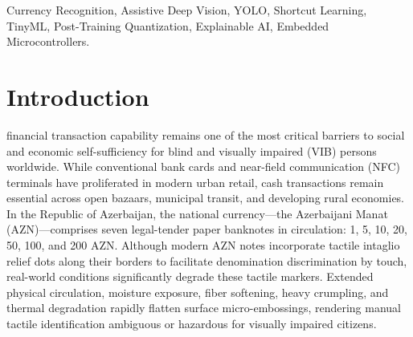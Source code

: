\documentclass[conference]{IEEEtran}
\begin{document}
\begin{IEEEkeywords}
Currency Recognition, Assistive Deep Vision, YOLO, Shortcut Learning, TinyML, Post-Training Quantization, Explainable AI, Embedded Microcontrollers.
\end{IEEEkeywords}

\section{Introduction}
\label{sec:intro}

 financial transaction capability remains one of the most critical barriers to social and economic self-sufficiency for blind and visually impaired (VIB) persons worldwide. While conventional bank cards and near-field communication (NFC) terminals have proliferated in modern urban retail, cash transactions remain essential across open bazaars, municipal transit, and developing rural economies. In the Republic of Azerbaijan, the national currency---the Azerbaijani Manat (AZN)---comprises seven legal-tender paper banknotes in circulation: 1, 5, 10, 20, 50, 100, and 200 AZN. Although modern AZN notes incorporate tactile intaglio relief dots along their borders to facilitate denomination discrimination by touch, real-world conditions significantly degrade these tactile markers. Extended physical circulation, moisture exposure, fiber softening, heavy crumpling, and thermal degradation rapidly flatten surface micro-embossings, rendering manual tactile identification ambiguous or hazardous for visually impaired citizens.
\end{document}
